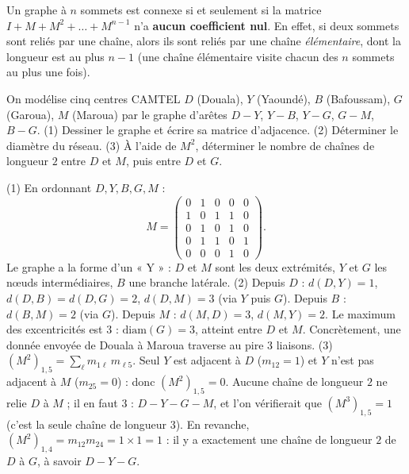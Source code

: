 \documentclass[11pt]{article}
\begin{document}
\begin{propriete}
Un graphe à $n$ sommets est connexe si et seulement si la matrice $I + M + M^2 + \dots + M^{n-1}$ n'a \textbf{aucun coefficient nul}. En effet, si deux sommets sont reliés par une chaîne, alors ils sont reliés par une chaîne \emph{élémentaire}, dont la longueur est au plus $n-1$ (une chaîne élémentaire visite chacun des $n$ sommets au plus une fois).
\end{propriete}

\begin{exercice}
On modélise cinq centres CAMTEL $D$ (Douala), $Y$ (Yaoundé), $B$ (Bafoussam), $G$ (Garoua), $M$ (Maroua) par le graphe d'arêtes $D\!-\!Y$, $Y\!-\!B$, $Y\!-\!G$, $G\!-\!M$, $B\!-\!G$. (1) Dessiner le graphe et écrire sa matrice d'adjacence. (2) Déterminer le diamètre du réseau. (3) À l'aide de $M^2$, déterminer le nombre de chaînes de longueur $2$ entre $D$ et $M$, puis entre $D$ et $G$.
\end{exercice}

\begin{corrige}[Exercice 1]
(1) En ordonnant $D, Y, B, G, M$ :
\[ M = \begin{pmatrix} 0 & 1 & 0 & 0 & 0 \\ 1 & 0 & 1 & 1 & 0 \\ 0 & 1 & 0 & 1 & 0 \\ 0 & 1 & 1 & 0 & 1 \\ 0 & 0 & 0 & 1 & 0 \end{pmatrix}. \]
Le graphe a la forme d'un « Y » : $D$ et $M$ sont les deux extrémités, $Y$ et $G$ les nœuds intermédiaires, $B$ une branche latérale.
(2) Depuis $D$ : $d(D,Y)=1$, $d(D,B)=d(D,G)=2$, $d(D,M)=3$ (via $Y$ puis $G$). Depuis $B$ : $d(B,M)=2$ (via $G$). Depuis $M$ : $d(M,D)=3$, $d(M,Y)=2$. Le maximum des excentricités est $3$ : $\mathrm{diam}(G) = 3$, atteint entre $D$ et $M$. Concrètement, une donnée envoyée de Douala à Maroua traverse au pire $3$ liaisons.
(3) $(M^2)_{1,5} = \displaystyle\sum_{\ell} m_{1\ell}\, m_{\ell 5}$. Seul $Y$ est adjacent à $D$ ($m_{12}=1$) et $Y$ n'est pas adjacent à $M$ ($m_{25}=0$) : donc $(M^2)_{1,5} = 0$. Aucune chaîne de longueur $2$ ne relie $D$ à $M$ ; il en faut $3$ : $D\!-\!Y\!-\!G\!-\!M$, et l'on vérifierait que $(M^3)_{1,5} = 1$ (c'est la seule chaîne de longueur $3$). En revanche, $(M^2)_{1,4} = m_{12}m_{24} = 1 \times 1 = 1$ : il y a exactement une chaîne de longueur $2$ de $D$ à $G$, à savoir $D\!-\!Y\!-\!G$.
\end{corrige}
\end{document}
